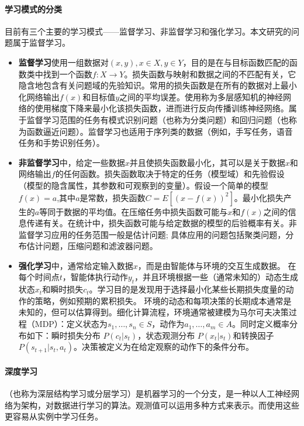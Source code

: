 \paragraph{学习模式的分类}\cite{ wiki:Artificial_neural_network}目前有三个主要的学习模式——监督学习、非监督学习和强化学习。本文研究的问题属于监督学习。
\begin{itemize}
  \item \textbf{监督学习}使用一组数据对$(x, y), x \in X, y \in Y$，目的是在与目标函数匹配的函数类中找到一个函数$f : X \rightarrow Y$。损失函数与映射和数据之间的不匹配有关，它隐含地包含有关问题域的先验知识。常用的损失函数是在所有的数据对上最小化网络输出$f(x)$和目标值$y$之间的平均误差。使用称为多层感知机的神经网络的使用梯度下降来最小化该损失函数，进而进行反向传播训练神经网络。属于监督学习范围的任务有模式识别问题（也称为分类问题）和回归问题（也称为函数逼近问题）。监督学习也适用于序列类的数据（例如，手写任务，语音任务和手势识别任务）。
  \item \textbf{非监督学习}中，给定一些数据$x$并且使损失函数最小化，其可以是关于数据$x$和网络输出$f$的任何函数。损失函数取决于特定的任务（模型域）和先验假设（模型的隐含属性，其参数和可观察到的变量）。假设一个简单的模型$f(x)=a$,其中$a$是常数，损失函数$C=E\left[(x-f(x))^{2}\right]$。最小化损失产生的$a$等同于数据的平均值。在压缩任务中损失函数可能与$x$和$f(x)$之间的信息传递有关。在统计中，损失函数可能与给定数据的模型的后验概率有关。非监督学习应用的任务范围一般是估计问题; 具体应用的问题包括聚类问题，分布估计问题，压缩问题和滤波器问题。
  \item \textbf{强化学习}中，通常给定输入数据$x$，而是由智能体与环境的交互生成数据。 在每个时间点$t$，智能体执行动作$y_{t}$，并且环境根据一些（通常未知的）动态生成状态$x_{t}$和瞬时损失$c_{t}$。学习目的是发现用于选择最小化某些长期损失度量的动作的策略，例如预期的累积损失。 环境的动态和每项决策的长期成本通常是未知的，但可以估算得到。细化计算流程，环境通常被建模为马尔可夫决策过程（MDP）：定义状态为$s_{1}, \dots, s_{n} \in S$，动作为$a_{1}, \dots, a_{m} \in A$。同时定义概率分布如下：瞬时损失分布
  $P\left(c_{t} | s_{t}\right)$，状态观测分布
  $P\left(x_{t}|s_{t}\right)$和转换因子$P\left(s_{t+1} | s_{t}, a_{t}\right)$。决策被定义为在给定观察的动作下的条件分布。
\end{itemize}

\paragraph{深度学习}\cite{ wiki:Deep_learning}（也称为深层结构学习或分层学习）是机器学习的一个分支，是一种以人工神经网络为架构，对数据进行学习的算法。观测值可以运用多种方式来表示。而使用这些更容易从实例中学习任务。

